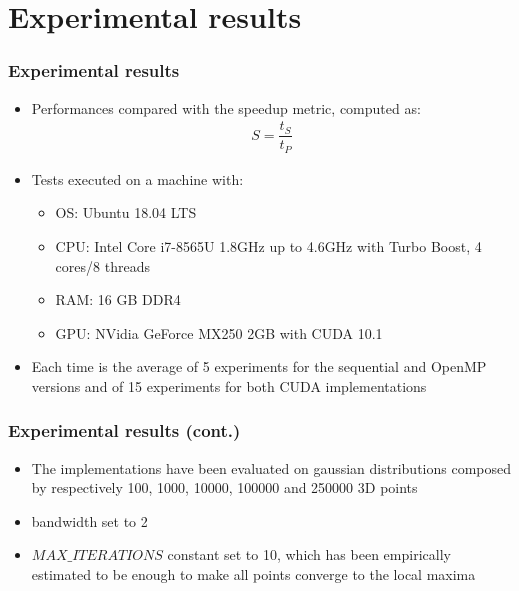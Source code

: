 \documentclass[xcolor=table]{beamer}
\begin{document}

\section{Experimental results}

\begin{frame}
\frametitle{Experimental results}
\begin{itemize}
\item Performances compared with the speedup metric, computed as:
\begin{align}
S = \dfrac{t_S}{t_P}
\end{align}
\item Tests executed on a machine with:
\vspace{0.15cm}
\begin{itemize}
\item OS: Ubuntu 18.04 LTS
\vspace{0.05cm}
\item CPU: Intel Core i7-8565U 1.8GHz up to 4.6GHz with Turbo Boost, 4 cores/8 threads
\vspace{0.05cm}
\item RAM: 16 GB DDR4
\vspace{0.05cm}
\item GPU: NVidia GeForce MX250 2GB with CUDA 10.1
\end{itemize}
\vspace{0.25cm}
\item Each time is the average of 5 experiments for the sequential and OpenMP versions and of 15 experiments for both CUDA implementations
\end{itemize}
\end{frame}


\begin{frame}
\frametitle{Experimental results (cont.)}
\begin{itemize}
\item The implementations have been evaluated on gaussian distributions composed by respectively 100, 1000, 10000, 100000 and 250000 3D points
\vspace{0.45cm}
\item bandwidth set to 2
\vspace{0.45cm}
\item $MAX\_ITERATIONS$ constant set to 10, which has been empirically estimated to be enough to make all points converge to the local maxima
\end{itemize}

\end{frame}
\end{document}
